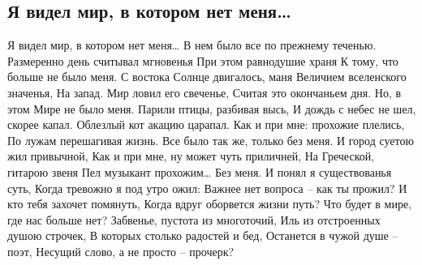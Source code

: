  
 
 

\subsection{Я видел мир, в котором нет меня…}


Я видел мир, в котором нет меня…
В нем было все по прежнему теченью.
Размеренно день считывал мгновенья
При этом равнодушие храня
К тому, что больше не было меня. 
С востока Солнце двигалось, маня
Величием вселенского значенья,
На запад. Мир ловил его свеченье,
Считая это окончаньем дня.
Но, в этом Мире не было меня.
Парили птицы, разбивая высь,
И дождь с небес не шел, скорее капал.
Облезлый кот акацию царапал.
Как и при мне: прохожие плелись,
По лужам перешагивая жизнь.
Все было так же, только без меня.
И город суетою жил привычной,
Как и при мне, ну может чуть приличней,
На Греческой, гитарою звеня
Пел музыкант прохожим… Без меня.
И понял я существованья суть,
Когда тревожно я под утро ожил:
Важнее нет вопроса – как ты прожил?
И кто тебя захочет помянуть,
Когда вдруг оборвется жизни путь?
Что будет в мире, где нас больше нет?
Забвенье, пустота из многоточий,
Иль из отстроенных душою строчек,
В которых столько радостей и бед,
Останется в чужой душе – поэт,
Несущий слово, а не просто – прочерк?
